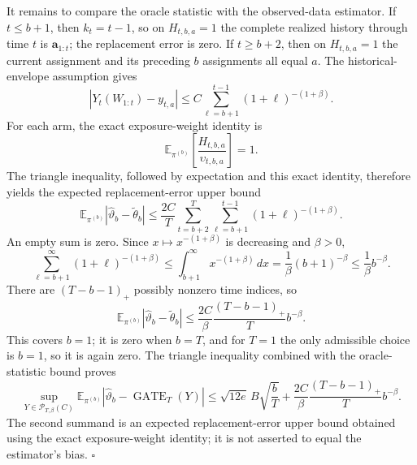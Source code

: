 It remains to compare the oracle statistic with the observed-data estimator. If \(t\le b+1\), then \(k_t=t-1\), so on \(H_{t,b,a}=1\) the complete realized history through time \(t\) is \(\mathbf a_{1:t}\); the replacement error is zero. If \(t\ge b+2\), then on \(H_{t,b,a}=1\) the current assignment and its preceding \(b\) assignments all equal \(a\). The historical-envelope assumption gives
\[
\left|Y_t(W_{1:t})-y_{t,a}\right|
\le C\sum_{\ell=b+1}^{t-1}(1+\ell)^{-(1+\beta)}.
\]
For each arm, the exact exposure-weight identity is
\[
\mathbb E_{\pi^{(b)}}\left[\frac{H_{t,b,a}}{\upsilon_{t,b,a}}\right]=1.
\]
The triangle inequality, followed by expectation and this exact identity, therefore yields the expected replacement-error upper bound
\[
\mathbb E_{\pi^{(b)}}|\widehat\vartheta_b-\widetilde\theta_b|
\le \frac{2C}{T}\sum_{t=b+2}^{T}\sum_{\ell=b+1}^{t-1}(1+\ell)^{-(1+\beta)}.
\]
An empty sum is zero. Since \(x\mapsto x^{-(1+\beta)}\) is decreasing and \(\beta>0\),
\[
\sum_{\ell=b+1}^{\infty}(1+\ell)^{-(1+\beta)}
\le\int_{b+1}^{\infty}x^{-(1+\beta)}\,dx
=\frac1\beta(b+1)^{-\beta}
\le\frac1\beta b^{-\beta}.
\]
There are \((T-b-1)_+\) possibly nonzero time indices, so
\[
\mathbb E_{\pi^{(b)}}|\widehat\vartheta_b-\widetilde\theta_b|
\le\frac{2C}{\beta}\frac{(T-b-1)_+}{T}b^{-\beta}.
\]
This covers \(b=1\); it is zero when \(b=T\), and for \(T=1\) the only admissible choice is \(b=1\), so it is again zero. The triangle inequality combined with the oracle-statistic bound proves
\[
\sup_{Y\in\mathcal P_{T,\beta}(C)}
\mathbb E_{\pi^{(b)}}
|\widehat\vartheta_b-\operatorname{GATE}_T(Y)|
\le\sqrt{12e}\,B\sqrt{\frac bT}
+\frac{2C}{\beta}\frac{(T-b-1)_+}{T}b^{-\beta}.
\]
The second summand is an expected replacement-error upper bound obtained using the exact exposure-weight identity; it is not asserted to equal the estimator's bias. \(\square\)